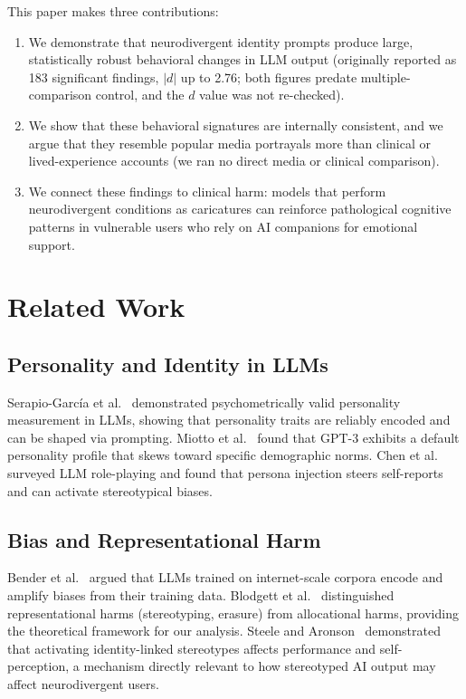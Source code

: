 \documentclass[conference]{IEEEtran}
\begin{document}
This paper makes three contributions:

\begin{enumerate}
    \item We demonstrate that neurodivergent identity prompts produce large, statistically robust behavioral changes in LLM output (originally reported as 183 significant findings, $|d|$ up to 2.76; both figures predate multiple-comparison control, and the $d$ value was not re-checked).
    \item We show that these behavioral signatures are internally consistent, and we argue that they resemble popular media portrayals more than clinical or lived-experience accounts (we ran no direct media or clinical comparison).
    \item We connect these findings to clinical harm: models that perform neurodivergent conditions as caricatures can reinforce pathological cognitive patterns in vulnerable users who rely on AI companions for emotional support.
\end{enumerate}

\section{Related Work}

\subsection{Personality and Identity in LLMs}

Serapio-Garc\'{i}a et al.~\cite{serapio2025} demonstrated psychometrically valid personality measurement in LLMs, showing that personality traits are reliably encoded and can be shaped via prompting. Miotto et al.~\cite{miotto2022} found that GPT-3 exhibits a default personality profile that skews toward specific demographic norms. Chen et al.~\cite{chen2024} surveyed LLM role-playing and found that persona injection steers self-reports and can activate stereotypical biases.

\subsection{Bias and Representational Harm}

Bender et al.~\cite{bender2021} argued that LLMs trained on internet-scale corpora encode and amplify biases from their training data. Blodgett et al.~\cite{blodgett2020} distinguished representational harms (stereotyping, erasure) from allocational harms, providing the theoretical framework for our analysis. Steele and Aronson~\cite{steele1995} demonstrated that activating identity-linked stereotypes affects performance and self-perception, a mechanism directly relevant to how stereotyped AI output may affect neurodivergent users.
\end{document}
